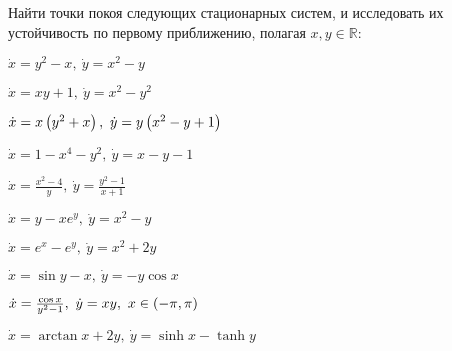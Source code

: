 	Найти точки покоя следующих стационарных систем, и исследовать их устойчивость по первому приближению, полагая $x, y \in \mathbb{R}$:
	\begin{multicols}{2}
		\begin{enumtasks}

			\label{stability_zeros:firstapprox2d}
			\item \( \dot{x} = y^2 - x, ~ \dot{y} = x^2 - y \) %
			\item \( \dot{x} = xy + 1, ~ \dot{y} = x^2 - y^2 \) %
			\item \( \dot{x} = x \left( y^2 + x \right), ~ \dot{y} = y \left( x^2 - y + 1 \right) \) %
			\item \( \dot{x} = 1 - x^4 - y^2, ~ \dot{y} = x - y - 1 \) %
			\item \( \dot{x} = \frac{x^2 - 4}{y}, ~ \dot{y} = \frac{y^2 - 1}{x + 1} \) %
			\item \( \dot{x} = y - xe^y, ~ \dot{y} = x^2 - y \) %
			\item \( \dot{x} = e^x - e^y, ~ \dot{y} = x^2 + 2y \) %
			\item \( \dot{x} = \sin{y} - x, ~ \dot{y} = - y \cos{x} \) %
			\item \( \dot{x} = \frac{\cos{x}}{y^2 - 1}, ~ \dot{y} = xy, ~ x \in \left( -\pi, \pi \right) \) %
			\item \( \dot{x} = \arctan{x} + 2y, ~ \dot{y} = \sinh{x} - \tanh{y} \) %

		\end{enumtasks}
	\end{multicols}

